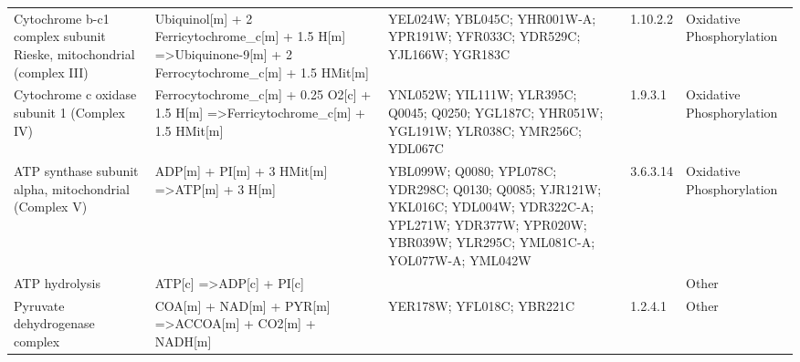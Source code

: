 \begin{table}[H]
\begin{center}
{\begin{tabular}{p{11cm}p{17cm}p{8cm}lp{5cm}}
Cytochrome b-c1 complex subunit Rieske, mitochondrial (complex III)                       & Ubiquinol{[}m{]} + 2 Ferricytochrome\_c{[}m{]} + 1.5 H{[}m{]} =\textgreater Ubiquinone-9{[}m{]} + 2 Ferrocytochrome\_c{[}m{]} + 1.5 HMit{[}m{]} & YEL024W; YBL045C; YHR001W-A; YPR191W; YFR033C; YDR529C; YJL166W; YGR183C                                                                                         & 1.10.2.2           & Oxidative Phosphorylation                                                   \\
Cytochrome c oxidase subunit 1 (Complex IV)                                               & Ferrocytochrome\_c{[}m{]} + 0.25 O2{[}c{]} + 1.5 H{[}m{]} =\textgreater Ferricytochrome\_c{[}m{]} + 1.5 HMit{[}m{]}                             & YNL052W; YIL111W; YLR395C; Q0045; Q0250; YGL187C; YHR051W; YGL191W; YLR038C; YMR256C; YDL067C                                                                    & 1.9.3.1            & Oxidative Phosphorylation                                                   \\
ATP synthase subunit alpha, mitochondrial (Complex V)                                     & ADP{[}m{]} + PI{[}m{]} + 3 HMit{[}m{]} =\textgreater ATP{[}m{]} + 3 H{[}m{]}                                                                    & YBL099W; Q0080; YPL078C; YDR298C; Q0130; Q0085; YJR121W; YKL016C; YDL004W; YDR322C-A; YPL271W; YDR377W; YPR020W; YBR039W; YLR295C; YML081C-A; YOL077W-A; YML042W & 3.6.3.14           & Oxidative Phosphorylation                                                   \\
ATP hydrolysis                                                                            & ATP{[}c{]} =\textgreater ADP{[}c{]} + PI{[}c{]}                                                                                                 &                                                                                                                                                                  &                    & Other                                                                       \\
Pyruvate dehydrogenase complex                                                            & COA{[}m{]} + NAD{[}m{]} + PYR{[}m{]} =\textgreater ACCOA{[}m{]} + CO2{[}m{]} + NADH{[}m{]}                                                      & YER178W; YFL018C; YBR221C                                                                                                                                        & 1.2.4.1            & Other                                                                       \\

\end{tabular}}
\end{center}
\end{table}
